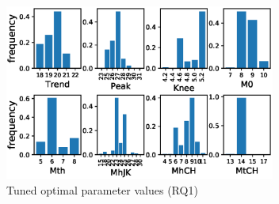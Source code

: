 \begin{figure}[t!]
\centering
\includegraphics[width=8.9cm]{figure/parameter.eps}
\caption{Tuned optimal parameter values (RQ1)}
\label{fig:parameter}
\end{figure}

